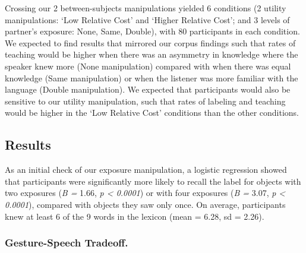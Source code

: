 \documentclass[10pt, letterpaper]{article}
\begin{document}
Crossing our 2 between-subjects manipulations yielded 6 conditions (2
utility manipulations: `Low Relative Cost' and `Higher Relative Cost';
and 3 levels of partner's exposure: None, Same, Double), with 80
participants in each condition. We expected to find results that
mirrored our corpus findings such that rates of teaching would be higher
when there was an asymmetry in knowledge where the speaker knew more
(None manipulation) compared with when there was equal knowledge (Same
manipulation) or when the listener was more familiar with the language
(Double manipulation). We expected that participants would also be
sensitive to our utility manipulation, such that rates of labeling and
teaching would be higher in the `Low Relative Cost' conditions than the
other conditions.

\subsection{Results}\label{results-1}

As an initial check of our exposure manipulation, a logistic regression
showed that participants were significantly more likely to recall the
label for objects with two exposures (\emph{B =} 1.66, \emph{p
\textless{} 0.0001}) or with four exposures (\emph{B =} 3.07, \emph{p
\textless{} 0.0001}), compared with objects they saw only once. On
average, participants knew at least 6 of the 9 words in the lexicon
(mean = 6.28, sd = 2.26).

\subsubsection{Gesture-Speech Tradeoff.}\label{gesture-speech-tradeoff.}
\end{document}
